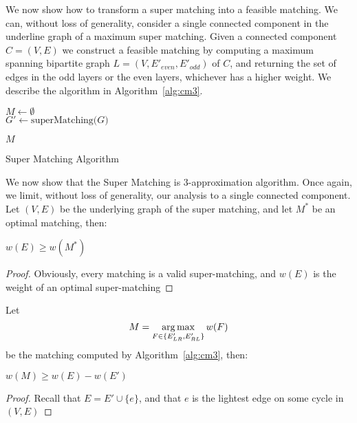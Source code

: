 We now show how to transform a super matching into a feasible matching.
We can, without loss of generality, 
consider a single connected component in the underline graph of a maximum super matching.
Given a connected component $C = (V, E)$ we construct a feasible matching by
computing a maximum spanning bipartite graph $L = (V, E'_{even}, E'_{odd})$ of $C$,
and returning the set of edges in the odd layers or the even layers,
whichever has a higher weight. 
We describe the algorithm in Algorithm~\ref{alg:cm3}.

\begin{algorithm}
\label{alg:cm3}

$M \leftarrow \emptyset$								\\
$G' \leftarrow \text{superMatching($G$)}$				\\


\Return $M$
\caption{Super Matching Algorithm}
\end{algorithm}

We now show that the Super Matching is 3-approximation algorithm.
Once again, we limit, without loss of generality, 
our analysis to a single connected component.
Let $(V, E)$ be the underlying graph of the super matching, 
and let $M^*$ be an optimal matching, then:
\begin{lemma}
\label{lm:super-geq-m^*}
$w(E) \geq w(M^*)$
\end{lemma}

\begin{proof}
Obviously, every matching is a valid super-matching, 
and $w(E)$ is the weight of an optimal super-matching 
\end{proof}

Let
$$ M = \operatorname*{arg\,max}_{F \in \{ E'_{LR}, E'_{RL} \}}{w(F)} $$
be the matching computed by Algorithm~\ref{alg:cm3}, then:

\begin{lemma}
\label{lm:more_than_e}
$w(M) \geq w(E) - w(E')$
\end{lemma}

\begin{proof}
Recall that $E = E' \cup \{e\}$, and that $e$ is the lightest edge on some cycle in $(V, E)$ 
\end{proof}

